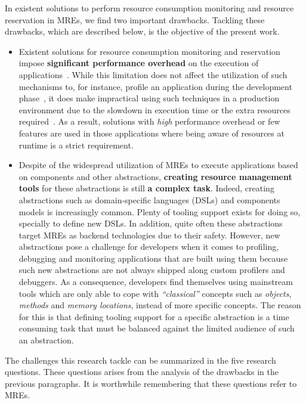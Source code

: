 In existent solutions to perform resource consumption monitoring and resource reservation in MREs, we find two important drawbacks.
Tackling these drawbacks, which are described below, is the objective of the present work.

\begin{itemize}
\item Existent solutions for resource consumption monitoring and reservation impose \textbf{significant performance overhead} on the execution of applications~\cite{}.
While this limitation does not affect the utilization of such mechanisms to, for instance, profile an application during the development phase~\cite{}, it does make impractical using such techniques in a production environment due to the slowdown in execution time or the extra resources required~\cite{}.
As a result, solutions with \textit{high} performance overhead or few features are used in those applications where being aware of resources at runtime is a strict requirement.

\item Despite of the widespread utilization of MREs to execute applications based on components and other abstractions, \textbf{creating resource management tools} for these abstractions is still \textbf{a complex task}.
Indeed, creating abstractions such as domain-specific languages (DSLs) and components models is increasingly common.
Plenty of tooling support exists for doing so, specially to define new DSLs.
In addition, quite often these abstractions target MREs as backend technologies due to their safety.
However, new abstractions pose a challenge for developers when it comes to profiling, debugging and monitoring applications that are built using them because such new abstractions are not always shipped along custom profilers and debuggers.
As a consequence, developers find themselves using mainstream tools which are only able to cope with \textit{``classical''} concepts such as \textit{objects}, \textit{methods} and \textit{memory locations}, instead of more specific concepts.
The reason for this is that defining tooling support for a specific abstraction is a time consuming task that must be balanced against the limited audience of such an abstraction.
\end{itemize}
 
The challenges this research tackle can be summarized in the five research questions.
These questions arises from the analysis of the drawbacks in the previous paragraphs.
It is worthwhile remembering that these questions refer to MREs.

